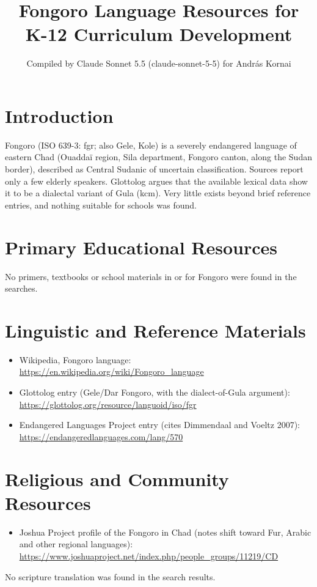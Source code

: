 \documentclass[12pt]{article}
\title{Fongoro Language Resources for K-12 Curriculum Development}
\author{Compiled by Claude Sonnet 5.5 (claude-sonnet-5-5) for Andr\'as Kornai}
\date{}
\begin{document}
\maketitle

\section{Introduction}
Fongoro (ISO 639-3: fgr; also Gele, Kole) is a severely endangered language of eastern Chad (Ouadda\"i region, Sila department, Fongoro canton, along the Sudan border), described as Central Sudanic of uncertain classification. Sources report only a few elderly speakers. Glottolog argues that the available lexical data show it to be a dialectal variant of Gula (kcm). Very little exists beyond brief reference entries, and nothing suitable for schools was found.

\section{Primary Educational Resources}
No primers, textbooks or school materials in or for Fongoro were found in the searches.

\section{Linguistic and Reference Materials}
\begin{itemize}
\item Wikipedia, Fongoro language: \url{https://en.wikipedia.org/wiki/Fongoro_language}
\item Glottolog entry (Gele/Dar Fongoro, with the dialect-of-Gula argument): \url{https://glottolog.org/resource/languoid/iso/fgr}
\item Endangered Languages Project entry (cites Dimmendaal and Voeltz 2007): \url{https://endangeredlanguages.com/lang/570}
\end{itemize}

\section{Religious and Community Resources}
\begin{itemize}
\item Joshua Project profile of the Fongoro in Chad (notes shift toward Fur, Arabic and other regional languages): \url{https://www.joshuaproject.net/index.php/people_groups/11219/CD}
\end{itemize}
No scripture translation was found in the search results.
\end{document}
